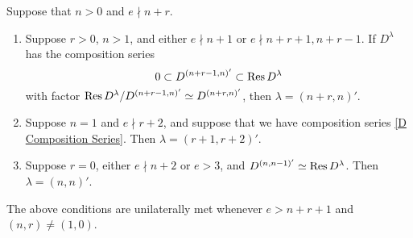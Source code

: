 \documentclass{amsart}
\begin{document}
\iffalse
\begin{proposition}
  Suppose that $n > 0$ and $e \nmid n + r$.
  \begin{enumerate}[label={(\roman*)}]
    \item Suppose $r > 0$, $n > 1$, and either $e \nmid n + 1$ or $e \nmid n + r + 1, n + r - 1$.
      If $D^\lambda$ has the composition series 
      \begin{equation}\label{D Composition Series}
        0 \subset D^{(n+r-1,n)'} \subset \text{Res} \, D^{\lambda}
      \end{equation}
      with factor $\text{Res} \, D^{\lambda} / D^{(n+r-1,n)'} \simeq D^{(n+r,n)'}$, then $\lambda = (n+r,n)'$.
    \item Suppose $n = 1$ and $e \nmid r+2$, and suppose that we have composition series \eqref{D Composition Series}.
      Then $\lambda=(r+1,r+2)'$.
    \item Suppose $r = 0$, either $e \nmid n+2$ or $e > 3$, and $D^{(n,n-1)'} \simeq \text{Res} \, D^\lambda$.
      Then $\lambda = (n,n)'$.
  \end{enumerate}
  The above conditions are unilaterally met whenever $e > n + r + 1$ and $(n,r) \neq (1,0)$.
\end{proposition}
\end{document}
